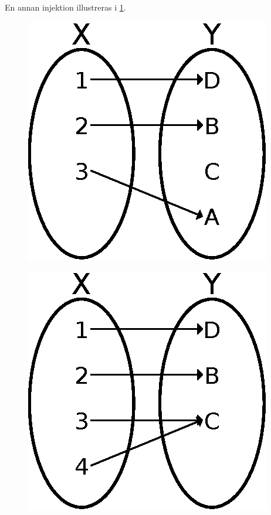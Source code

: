 En annan injektion illustreras i \cref{fig:Injektion}.
\begin{figure}
  \begin{minipage}{0.3\textwidth}
    \includegraphics[width=\textwidth]{figs/injection.eps}
    \label{fig:Injektion}
  \end{minipage}
  \hfill
  \begin{minipage}{0.3\textwidth}
    \includegraphics[width=\textwidth]{figs/surjection.eps}

\end{minipage}
\end{figure}
